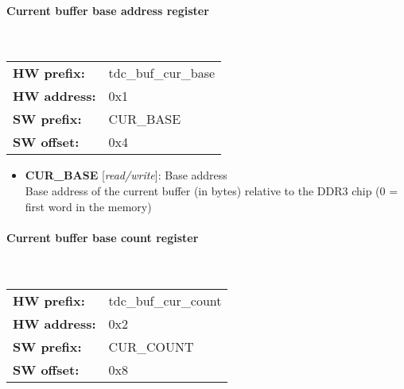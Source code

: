 \paragraph*{Current buffer base address register}\mbox{}\\\vskip 6pt
\begin{tabular}{l l }
{\bf HW prefix:}  & tdc\_buf\_cur\_base\\
{\bf HW address:}  & 0x1\\
{\bf SW prefix:}  & CUR\_BASE\\
{\bf SW offset:}  & 0x4\\
\end{tabular}


\vspace{12pt}
\noindent
{}

\begin{itemize}
\item \begin{small}
{\bf 
CUR\_BASE
} [\emph{read/write}]: Base address
\\
Base address of the current buffer (in bytes) relative to the DDR3 chip (0 = first word in the memory)
\end{small}
\end{itemize}
\paragraph*{Current buffer base count register}\mbox{}\\\vskip 6pt
\begin{tabular}{l l }
{\bf HW prefix:}  & tdc\_buf\_cur\_count\\
{\bf HW address:}  & 0x2\\
{\bf SW prefix:}  & CUR\_COUNT\\
{\bf SW offset:}  & 0x8\\
\end{tabular}


